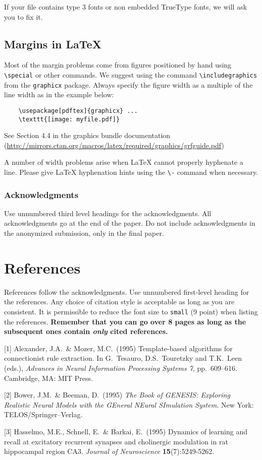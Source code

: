 \documentclass{article}
\begin{document}
	If your file contains type 3 fonts or non embedded TrueType fonts, we
	will ask you to fix it.
	
	\subsection{Margins in \LaTeX{}}
	
	Most of the margin problems come from figures positioned by hand using
	\verb+\special+ or other commands. We suggest using the command
	\verb+\includegraphics+ from the \verb+graphicx+ package. Always
	specify the figure width as a multiple of the line width as in the
	example below:
	\begin{verbatim}
	\usepackage[pdftex]{graphicx} ...
	\texttt{[image: myfile.pdf]}
	\end{verbatim}
	See Section 4.4 in the graphics bundle documentation
	(\url{http://mirrors.ctan.org/macros/latex/required/graphics/grfguide.pdf})
	
	A number of width problems arise when \LaTeX{} cannot properly
	hyphenate a line. Please give LaTeX hyphenation hints using the
	\verb+\-+ command when necessary.
	
	\subsubsection*{Acknowledgments}
	
	Use unnumbered third level headings for the acknowledgments. All
	acknowledgments go at the end of the paper. Do not include
	acknowledgments in the anonymized submission, only in the final paper.
	
	\section*{References}
	
	References follow the acknowledgments. Use unnumbered first-level
	heading for the references. Any choice of citation style is acceptable
	as long as you are consistent. It is permissible to reduce the font
	size to \verb+small+ (9 point) when listing the references. {\bf
		Remember that you can go over 8 pages as long as the subsequent ones contain
		\emph{only} cited references.}
	\medskip
	
	\small
	
	[1] Alexander, J.A.\ \& Mozer, M.C.\ (1995) Template-based algorithms
	for connectionist rule extraction. In G.\ Tesauro, D.S.\ Touretzky and
	T.K.\ Leen (eds.), {\it Advances in Neural Information Processing
		Systems 7}, pp.\ 609--616. Cambridge, MA: MIT Press.
	
	[2] Bower, J.M.\ \& Beeman, D.\ (1995) {\it The Book of GENESIS:
		Exploring Realistic Neural Models with the GEneral NEural SImulation
		System.}  New York: TELOS/Springer--Verlag.
	
	[3] Hasselmo, M.E., Schnell, E.\ \& Barkai, E.\ (1995) Dynamics of
	learning and recall at excitatory recurrent synapses and cholinergic
	modulation in rat hippocampal region CA3. {\it Journal of
		Neuroscience} {\bf 15}(7):5249-5262.
	
\end{document}
